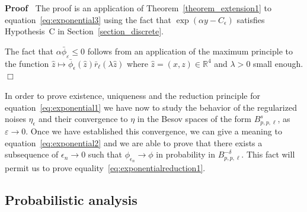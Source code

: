 \documentclass[a4paper,10pt]{article}
\newenvironment{proof}{\noindent\textbf{Proof\ }}{\hspace*{\fill}$\Box$\medskip}
\begin{document}
\begin{proof}
  The proof is an application of Theorem~\ref{theorem_extension1} to
  equation~{\eqref{eq:exponential3}} using the fact that $\exp (\alpha y -
  C_{\epsilon})$ satisfies Hypothesis~C in Section~\ref{section_discrete}.
  
  The fact that $\alpha \bar{\phi}_{\varepsilon} \leqslant 0$ follows from an
  application of the maximum principle to the function $\hat{z} \mapsto
  \bar{\phi}_{\epsilon} (\hat{z})  \bar{r}_{\ell} (\lambda \hat{z})$ where
  $\hat{z} = (x, z) \in \mathbb{R}^4$ and $\lambda > 0$ small enough.
\end{proof}

In order to prove existence, uniqueness and the reduction principle for
equation~{\eqref{eq:exponential1}} we have now to study the behavior of the
regularized noises $\eta_{\epsilon}$ and their convergence to $\eta$ in the
Besov spaces of the form $B^s_{p, p, \ell}$, as $\varepsilon \rightarrow 0$.
Once we have established this convergence, we can give a meaning to
equation~{\eqref{eq:exponential2}} and we are able to prove that there exists
a subsequence of $\epsilon_n \rightarrow 0$ such that $\phi_{\epsilon_n}
\rightarrow \phi$ in probability in $B^{- \delta}_{p, p, \ell}$. This fact
will permit us to prove equality~{\eqref{eq:exponentialreduction1}}.

\subsection{Probabilistic analysis}\label{subsection_probabilistic}
\end{document}
